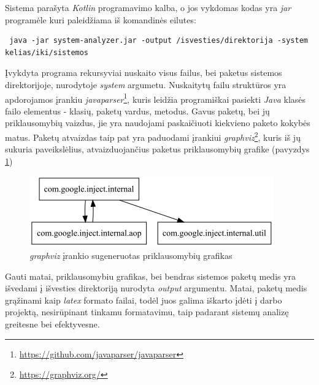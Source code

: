 Sistema parašyta \textit{Kotlin} programavimo kalba, o jos vykdomas kodas yra \textit{jar} programėle kuri paleidžiama iš komandinės eilutes:
\begin{lstlisting}
 java -jar system-analyzer.jar -output /isvesties/direktorija -system  kelias/iki/sistemos
\end{lstlisting}
Įvykdyta programa rekursyviai nuskaito visus failus, bei paketus sistemos direktorijoje, nurodytoje \textit{system} argumetu.
Nuskaitytų failu struktūros yra apdorojamos įrankiu \textit{javaparser}\footnote{\url{https://github.com/javaparser/javaparser}}, kuris leidžia
programiškai pasiekti \textit{Java} klasės failo elementus - klasių, paketų vardus, metodus.
Gavus paketų, bei jų priklausomybių vaizdus, jie yra naudojami paskaičiuoti kiekvieno paketo kokybės matus.
Paketų atvaizdas taip pat yra paduodami įrankiui \textit{graphviz}\footnote{\url{https://graphviz.org/}}, kuris iš jų sukuria paveikslėlius, atvaizduojančius paketus
priklausomybių grafike (pavyzdys \ref{img:graphviz})
\begin{figure}[H]
    \centering
    \includegraphics[scale=0.6]{img/packages_example}
    \caption{\textit{graphviz} įrankio sugeneruotas priklausomybių grafikas}
    \label{img:graphviz}
\end{figure}
Gauti matai, priklausomybiu grafikas, bei bendras sistemos paketų medis yra išvedami į išvesties direktoriją nurodyta \textit{output} argumentu.
Matai, paketų medis grąžinami kaip \textit{latex} formato failai, todėl juos galima iškarto įdėti į darbo projektą, nesirūpinant tinkamu formatavimu,
taip padarant sistemų analizę greitesne bei efektyvesne.
